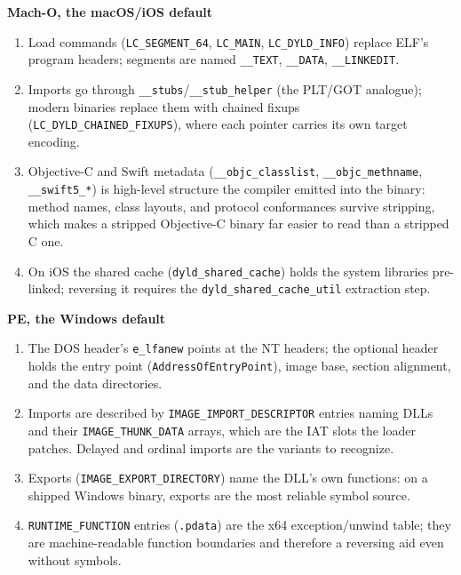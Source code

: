 \documentclass[12pt]{Training}
\begin{document}
\textbf{Mach-O, the macOS/iOS default}
\begin{enumerate}
    \item Load commands (\lstinline{LC_SEGMENT_64}, \lstinline{LC_MAIN}, \lstinline{LC_DYLD_INFO}) replace ELF's program headers; segments are named \lstinline{__TEXT}, \lstinline{__DATA}, \lstinline{__LINKEDIT}.
    \item Imports go through \lstinline{__stubs}/\lstinline{__stub_helper} (the PLT/GOT analogue); modern binaries replace them with chained fixups (\lstinline{LC_DYLD_CHAINED_FIXUPS}), where each pointer carries its own target encoding.
    \item Objective-C and Swift metadata (\lstinline{__objc_classlist}, \lstinline{__objc_methname}, \lstinline{__swift5_*}) is high-level structure the compiler emitted into the binary: method names, class layouts, and protocol conformances survive stripping, which makes a stripped Objective-C binary far easier to read than a stripped C one.
    \item On iOS the shared cache (\lstinline{dyld_shared_cache}) holds the system libraries pre-linked; reversing it requires the \lstinline{dyld_shared_cache_util} extraction step.
\end{enumerate}

\textbf{PE, the Windows default}
\begin{enumerate}
    \item The DOS header's \lstinline{e_lfanew} points at the NT headers; the optional header holds the entry point (\lstinline{AddressOfEntryPoint}), image base, section alignment, and the data directories.
    \item Imports are described by \lstinline{IMAGE_IMPORT_DESCRIPTOR} entries naming DLLs and their \lstinline{IMAGE_THUNK_DATA} arrays, which are the IAT slots the loader patches. Delayed and ordinal imports are the variants to recognize.
    \item Exports (\lstinline{IMAGE_EXPORT_DIRECTORY}) name the DLL's own functions: on a shipped Windows binary, exports are the most reliable symbol source.
    \item \lstinline{RUNTIME_FUNCTION} entries (\lstinline{.pdata}) are the x64 exception/unwind table; they are machine-readable function boundaries and therefore a reversing aid even without symbols.
\end{enumerate}
\end{document}
